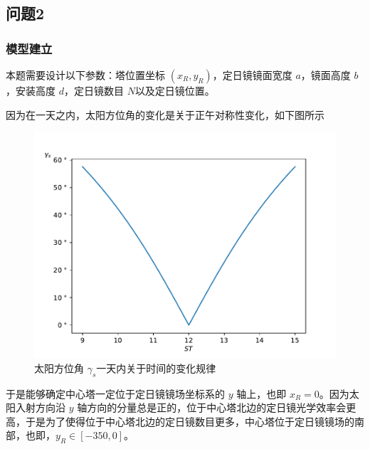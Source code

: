 \subsection{问题2}
\subsubsection{模型建立}
本题需要设计以下参数：塔位置坐标 \((x_{R}, y_{R})\)，定日镜镜面宽度 \(a\)，镜面高度 \(b\)，安装高度 \(d\)，定日镜数目 \(N\)以及定日镜位置。

因为在一天之内，太阳方位角的变化是关于正午对称性变化，如下图所示
\begin{figure}[H]
\centering
\includegraphics[scale = 0.4]{gammas.pdf}
\caption{\kaishu 太阳方位角 \(\gamma_{s}\)一天内关于时间的变化规律}
\end{figure}
于是能够确定中心塔一定位于定日镜镜场坐标系的 \(y\) 轴上，也即 \(x _{R} = 0\)。因为太阳入射方向沿 \(y\) 轴方向的分量总是正的，位于中心塔北边的定日镜光学效率会更高，于是为了使得位于中心塔北边的定日镜数目更多，中心塔位于定日镜镜场的南部，也即，\(y _{R} \in [-350 , 0]\)。

